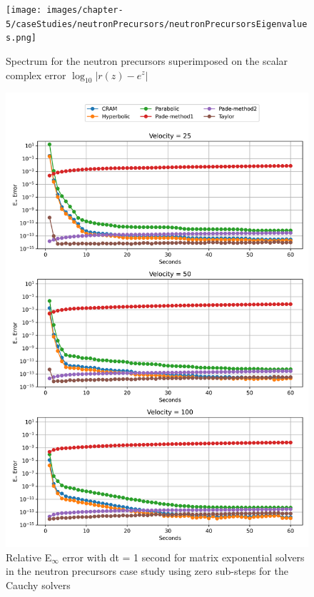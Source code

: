 \clearpage

\begin{figure}
    \centering
    \texttt{[image: images/chapter-5/caseStudies/neutronPrecursors/neutronPrecursorsEigenvalues.png]}
    \caption{Spectrum for the neutron precursors superimposed on the scalar complex error $\log_{10}|r(z)-e^{z}|$}
    \label{fig:spectrum_neutron_precursors}
\end{figure}

\clearpage

\begin{figure}[p]
    \centering
    \includegraphics[width=5in]{images/chapter-5/caseStudies/neutronPrecursors/dt1/neutronPrecursorsEinfErrorerrorSteps0.png}
    \caption{Relative E$_{\infty}$ error with dt = 1 second for matrix exponential solvers in the neutron precursors case study using zero sub-steps for the Cauchy solvers}
    \label{fig:neutron_precursors_Einf_steps0}
\end{figure}

